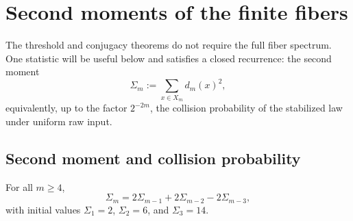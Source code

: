 \section{Second moments of the finite fibers}\label{sec:fiber-spectrum}

The threshold and conjugacy theorems do not require the full fiber spectrum. One statistic will be useful below and satisfies a closed recurrence: the second moment
\[
\Sigma_m:=\sum_{x\in X_m}d_m(x)^2,
\]
equivalently, up to the factor $2^{-2m}$, the collision probability of the stabilized law under uniform raw input.

\subsection{Second moment and collision probability}\label{sec:fiber-collision}

\begin{theorem}\label{prop:second-moment-recurrence}
For all $m\ge4$,
\begin{equation}\label{eq:sigma-recurrence}
\Sigma_m=2\Sigma_{m-1}+2\Sigma_{m-2}-2\Sigma_{m-3},
\end{equation}
with initial values $\Sigma_1=2$, $\Sigma_2=6$, and $\Sigma_3=14$.
\end{theorem}

